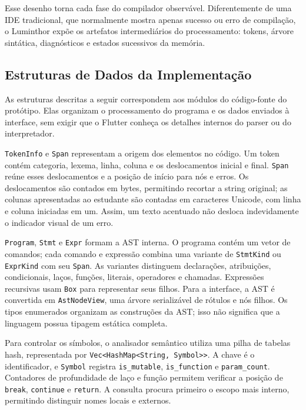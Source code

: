 \documentclass[
    12pt
    ,oneside
    ,a4paper
    ,chapter=TITLE
    ,section=TITLE
    ,sumario=abnt-6027-2012]{abntex2}
\begin{document}
Esse desenho torna cada fase do compilador observável. Diferentemente de uma IDE tradicional,
que normalmente mostra apenas sucesso ou erro de compilação, o Luminthor expõe os artefatos
intermediários do processamento: tokens, árvore sintática, diagnósticos e estados sucessivos
da memória.

\subsection{Estruturas de Dados da Implementação}
\label{sec:estruturas_implementacao}

As estruturas descritas a seguir correspondem aos módulos do código-fonte do protótipo.
Elas organizam o processamento do programa e os dados enviados à interface,
sem exigir que o Flutter conheça os detalhes internos do parser ou do interpretador.

\texttt{TokenInfo} e \texttt{Span} representam a origem dos elementos no código.
Um token contém categoria, lexema, linha, coluna e os deslocamentos inicial e final.
\texttt{Span} reúne esses deslocamentos e a posição de início para nós e erros. Os
deslocamentos são contados em bytes, permitindo recortar a string original; as colunas
apresentadas ao estudante são contadas em caracteres Unicode, com linha e coluna iniciadas
em um. Assim, um texto acentuado não desloca indevidamente o indicador visual de um erro.

\texttt{Program}, \texttt{Stmt} e \texttt{Expr} formam a AST interna. O programa contém
um vetor de comandos; cada comando e expressão combina uma variante de \texttt{StmtKind}
ou \texttt{ExprKind} com seu \texttt{Span}. As variantes distinguem declarações,
atribuições, condicionais, laços, funções, literais, operadores e chamadas. Expressões
recursivas usam \texttt{Box} para representar seus filhos. Para a interface, a AST é
convertida em \texttt{AstNodeView}, uma árvore serializável de rótulos e nós filhos.
Os tipos enumerados organizam as construções da AST; isso não significa que a linguagem
possua tipagem estática completa.

Para controlar os símbolos, o analisador semântico utiliza uma pilha de tabelas hash,
representada por \texttt{Vec<HashMap<String, Symbol>>}. A chave é o identificador, e \texttt{Symbol}
registra \texttt{is\_mutable}, \texttt{is\_function} e \texttt{param\_count}.
Contadores de profundidade de laço e função permitem verificar a posição de
\texttt{break}, \texttt{continue} e \texttt{return}. A consulta procura primeiro
o escopo mais interno, permitindo distinguir nomes locais e externos.
\end{document}
